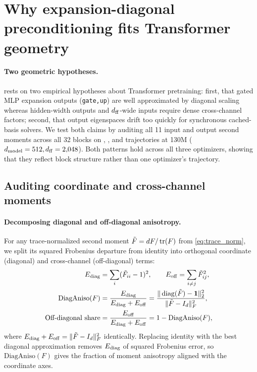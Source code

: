 \section{Why expansion-diagonal preconditioning fits Transformer geometry}
\label{sec:diagnosis}

\paragraph{Two geometric hypotheses.}
 rests on two empirical hypotheses about Transformer pretraining: first, that gated MLP expansion outputs (\texttt{gate,up}) are well approximated by diagonal scaling whereas hidden-width outputs and $d_{\mathrm{ff}}$-wide inputs require dense cross-channel factors; second, that output eigenspaces drift too quickly for synchronous cached-basis solvers. We test both claims by auditing all 11 input and output second moments across all 32 blocks on , , and  trajectories at 130M ($d_{\mathrm{model}}=512,d_{\mathrm{ff}}=2{,}048$). Both patterns hold across all three optimizers, showing that they reflect block structure rather than one optimizer's trajectory.

\subsection{Auditing coordinate and cross-channel moments}
\label{sec:diagnosis_setup}

\paragraph{Decomposing diagonal and off-diagonal anisotropy.}
For any trace-normalized second moment $\tilde F=dF/\operatorname{tr}(F)$ from \cref{eq:trace_norm}, we split its squared Frobenius departure from identity into orthogonal coordinate (diagonal) and cross-channel (off-diagonal) terms:
\begin{equation}
 \begin{aligned}
 E_{\rm diag}&=\sum_i(\tilde F_{ii}-1)^2,\qquad E_{\rm off}=\sum_{i\ne j}\tilde F_{ij}^2,\\
 \mathrm{DiagAniso}(F)&=\frac{E_{\rm diag}}{E_{\rm diag}+E_{\rm off}}
 =\frac{\|\operatorname{diag}(\tilde F)-\mathbf1\|_2^2}{\|\tilde F-I_d\|_F^2},\\
 \text{Off-diagonal share}&=\frac{E_{\rm off}}{E_{\rm diag}+E_{\rm off}}
 =1-\mathrm{DiagAniso}(F),
 \end{aligned}
 \label{eq:diag_aniso}
\end{equation}
where $E_{\rm diag}+E_{\rm off}=\|\tilde F-I_d\|_F^2$ identically. Replacing identity with the best diagonal approximation removes $E_{\rm diag}$ of squared Frobenius error, so $\mathrm{DiagAniso}(F)$ gives the fraction of moment anisotropy aligned with the coordinate axes.

